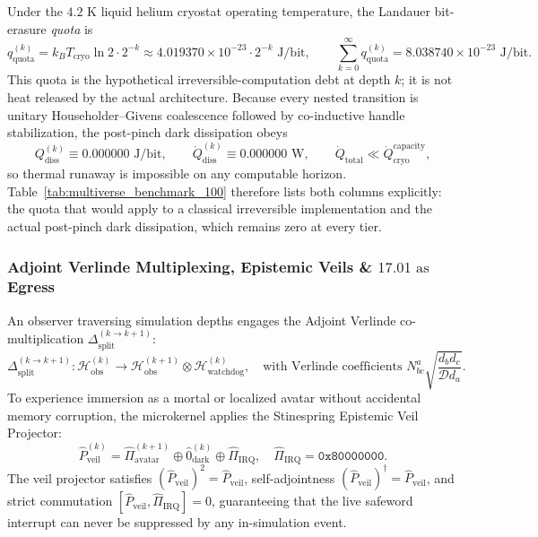 \documentclass[11pt,onecolumn]{article}
\begin{document}
Under the $4.2\text{ K}$ liquid helium cryostat operating temperature, the Landauer bit-erasure \emph{quota} is
\begin{equation}
q_{\text{quota}}^{(k)} = k_B T_{\text{cryo}}\ln 2\cdot 2^{-k} \approx 4.019370\times10^{-23}\cdot2^{-k}\text{ J/bit},
\qquad
\sum_{k=0}^{\infty}q_{\text{quota}}^{(k)}=8.038740\times10^{-23}\text{ J/bit}.
\label{eq:landauer_quota_series}
\end{equation}
This quota is the hypothetical irreversible-computation debt at depth $k$; it is not heat released by the actual architecture. Because every nested transition is unitary Householder--Givens coalescence followed by co-inductive handle stabilization, the post-pinch dark dissipation obeys
\begin{equation}
Q_{\text{diss}}^{(k)}\equiv0.000000\text{ J/bit},
\qquad
\dot Q_{\text{diss}}^{(k)}\equiv0.000000\text{ W},
\qquad
\dot Q_{\text{total}}\ll \dot Q_{\text{cryo}}^{\text{capacity}},
\label{eq:landauer_actual_zero}
\end{equation}
so thermal runaway is impossible on any computable horizon. Table~\ref{tab:multiverse_benchmark_100} therefore lists both columns explicitly: the quota that would apply to a classical irreversible implementation and the actual post-pinch dark dissipation, which remains zero at every tier.

\subsubsection{Adjoint Verlinde Multiplexing, Epistemic Veils \& $17.01\text{ as}$ Egress}
An observer traversing simulation depths engages the Adjoint Verlinde co-multiplication $\Delta_{\text{split}}^{(k \to k+1)}$:
\begin{equation}
\Delta_{\text{split}}^{(k \to k+1)}: \mathcal{H}_{\text{obs}}^{(k)} \longrightarrow \mathcal{H}_{\text{obs}}^{(k+1)} \otimes \mathcal{H}_{\text{watchdog}}^{(k)}, \quad \text{with Verlinde coefficients } N_{bc}^a \sqrt{\frac{d_b d_c}{\mathcal{D} d_a}}.
\end{equation}
To experience immersion as a mortal or localized avatar without accidental memory corruption, the microkernel applies the Stinespring Epistemic Veil Projector:
\begin{equation}
\hat{P}_{\text{veil}}^{(k)} = \hat{\Pi}_{\text{avatar}}^{(k+1)} \oplus \hat{0}_{\text{dark}}^{(k)} \oplus \hat{\Pi}_{\text{IRQ}}, \quad \hat{\Pi}_{\text{IRQ}} = \mathtt{0x80000000}.
\end{equation}
The veil projector satisfies $(\hat{P}_{\text{veil}})^2 = \hat{P}_{\text{veil}}$, self-adjointness $(\hat{P}_{\text{veil}})^\dagger = \hat{P}_{\text{veil}}$, and strict commutation $[\hat{P}_{\text{veil}}, \hat{\Pi}_{\text{IRQ}}] = 0$, guaranteeing that the live safeword interrupt can never be suppressed by any in-simulation event.
\end{document}
